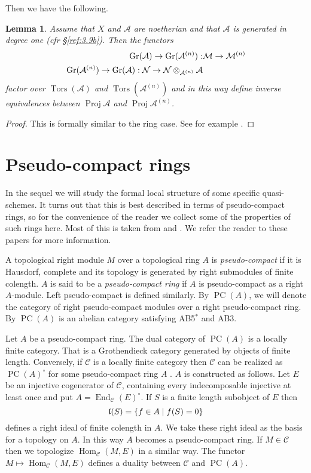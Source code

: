 \documentclass{amsproc}
\def\Ascr{{\mathcal A}}
\def\Cscr{{\mathcal C}}
\def\Mscr{{\mathcal M}}
\def\Nscr{{\mathcal N}}
\def\Gr{\mathop{\text{Gr}}}
\def\Tors{\operatorname{Tors}}
\def\Hom{\operatorname {Hom}}
\def\End{\operatorname {End}}
\def\Proj{\operatorname {Proj}}
\def\Tors{\operatorname {Tors}}
\def\r{\rightarrow}
\let\oldtext\text
\def\text#1{\oldtext{\upshape #1}}
\DeclareMathOperator{\PC}{PC}
\newtheorem{lemmas}{Lemma}[subsection]
\theoremstyle{definition}
\theoremstyle{remark}
\numberwithin{equation}{section}
\numberwithin{table}{section}
\numberwithin{figure}{section}
\def\Gr{\mathop{\text{Gr}}}
\begin{document}
Then we have the
following.
\begin{lemmas} 
\label{ref:3.12.1a}
Assume that $X$ and $\Ascr$ are noetherian and that
$\Ascr$ is generated in degree one (cfr \S\ref{ref:3.9b}).
 Then the functors
\begin{align*}
\Gr(\Ascr)\r \Gr(\Ascr^{(n)}):&\Mscr\r \Mscr^{(n)}\\
\Gr(\Ascr^{(n)})\r\Gr(\Ascr):\Nscr\r \Nscr\otimes_{\Ascr^{(n)}}\Ascr
\end{align*}
factor over $\Tors(\Ascr)$ and $\Tors(\Ascr^{(n)})$ and in this way define
inverse equivalences between $\Proj\Ascr$ and $\Proj\Ascr^{(n)}$.
\end{lemmas}
\begin{proof}
This is formally similar to the ring case. See for example
\cite{V}.
\end{proof}












\section{Pseudo-compact rings}
\label{ref:4a}
In the sequel we will study the formal local structure of some
specific quasi-schemes. It turns out that this is best described in
terms of pseudo-compact rings, so for the convenience of the reader we
collect some of the properties of such rings here. Most of this is
taken from \cite{VdBVG} and \cite{Gabriel}. We refer the reader to
these papers for more information.

A topological right  module $M$ over a topological ring $A$
is \emph{pseudo-compact} if it is Hausdorf, complete and its topology
is generated by right submodules of finite colength. $A$ is said to be a
\emph{pseudo-compact ring} if $A$ is pseudo-compact as a right $A$-module.
Left pseudo-compact is defined similarly. By $\PC(A)$,
we will denote the category of right pseudo-compact modules over a
right pseudo-compact ring. By \cite{Gabriel}  $\PC(A)$ is an
abelian category satisfying AB5$^\ast$ and AB3. 

Let
$A$  be a pseudo-compact ring.
The dual category of $\PC(A)$ is a  locally finite category. That is a
Grothendieck category generated by  objects of finite length.
Conversely, if $\Cscr$ is a locally finite category then $\Cscr$ can be
realized as $\PC(A)^\circ$ for some pseudo-compact ring $A$ 
\cite{Gabriel}. $A$ is constructed as follows. Let $E$ be an injective
cogenerator of $\Cscr$, containing every indecomposable injective at
least once and put $A=\End_\Cscr(E)^\circ$. If $S$ is a
finite length subobject of $E$ then
\[
\frak{l}(S)=\{f\in A\mid f(S)=0\}
\]
defines a right ideal of finite colength in $A$. We take these right
ideal as the basis for a topology on $A$. In this way $A$ becomes a
pseudo-compact ring.
If $M\in \Cscr$ then we topologize $\Hom_\Cscr(M,E)$ in a similar way.
The functor $M\mapsto \Hom_\Cscr(M,E)$ defines a duality between $\Cscr$
and $\PC(A)$.
\end{document}
